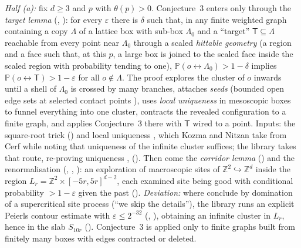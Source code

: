 \documentclass[11pt]{article}
\theoremstyle{definition}
\theoremstyle{remark}
\newcommand{\PP}{\mathbb{P}}
\newcommand{\Zd}{\mathbb{Z}^d}
\newcommand{\ZZ}{\mathbb{Z}}
\newcommand{\con}{\leftrightarrow}
\begin{document}
 \emph{Half (a):} fix $d\ge3$ and $p$ with $\theta(p)>0$.  Conjecture~3 enters only through the \emph{target lemma} \citep[Lemma~10]{KozmaNitzan2024}
(, ): for every $\varepsilon$ there is $\delta$ such that, in any finite weighted graph
containing a copy $\Lambda$ of a lattice box with sub-box $\Lambda_0$ and a ``target'' $\mathsf T\subseteq\Lambda$ reachable from every point near
$\Lambda_0$ through a scaled \emph{hittable geometry} \citep[p.~16]{KozmaNitzan2024} (a region and a face such that, at this $p$, a large box is joined to
the scaled face inside the scaled region with probability tending to one), $\PP(o\con\Lambda_0)>1-\delta$ implies $\PP(o\con\mathsf T)>1-\varepsilon$ for all $o\notin\Lambda$.  The
proof explores the cluster of $o$ inwards until a shell of $\Lambda_0$ is crossed by many branches, attaches \emph{seeds} (bounded open edge sets at selected contact points \citep[p.~19]{KozmaNitzan2024}), uses
\emph{local uniqueness} in mesoscopic boxes to funnel everything into one cluster, contracts the revealed configuration to a finite graph, and applies
Conjecture~3 there with $\mathsf T$ wired to a point.  Inputs: the square-root trick \citep[(11.14)]{GrimmettPercolation1999} ()
and local uniqueness \citep[Lemma~7]{KozmaNitzan2024}, which Kozma and Nitzan take from Cerf \citep{Cerf2015} while noting that uniqueness of the
infinite cluster suffices; the library takes that route, re-proving uniqueness \citep{AizenmanKestenNewmanCMP1987,BurtonKeane1989},
\citep[Thm.~(8.1)]{GrimmettPercolation1999} ().  Then come the \emph{corridor lemma}
\citep[Lemmas~11--12]{KozmaNitzan2024} () and the renormalisation \citep[pp.~25--31]{KozmaNitzan2024}
(, , ): an exploration of macroscopic sites of $\ZZ^2\hookrightarrow\Zd$ inside the region
$L_r=\ZZ^2\times[-5r,5r]^{d-2}$, each examined site being good with conditional probability $>1-\varepsilon$ given the past \citep[(33)]{KozmaNitzan2024}
().  \emph{Deviation:} where \citep[p.~25]{KozmaNitzan2024} conclude by domination of a supercritical site
process (``we skip the details''), the library runs an explicit Peierls contour estimate with $\varepsilon\le2^{-32}$ (,
), obtaining an infinite cluster in $L_r$, hence in the slab $S_{10r}$ ().
Conjecture~3 is applied only to finite graphs built from finitely many boxes with edges contracted or deleted.
\end{document}
